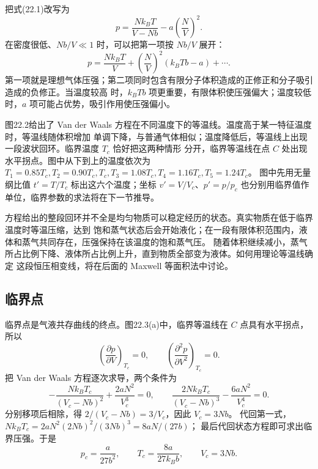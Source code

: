 把式(22.1)改写为
\[
  p=\frac{Nk_BT}{V-Nb}-a\left(\frac NV\right)^2.
\]
在密度很低、$Nb/V\ll1$ 时，可以把第一项按 $Nb/V$ 展开：
\begin{equation}
  \boxed{p=\frac{Nk_BT}{V}
  +\left(\frac NV\right)^2(k_BT b-a)+\cdots }.
  \tag{22.2}
\end{equation}
第一项就是理想气体压强；第二项同时包含有限分子体积造成的正修正和分子吸引造成的负修正。当温度较高
时，$k_BT b$ 项更重要，有限体积使压强偏大；温度较低时，$a$ 项可能占优势，吸引作用使压强偏小。

图22.2给出了 Van der Waals 方程在不同温度下的等温线。温度高于某一特征温度时，等温线随体积增加
单调下降，与普通气体相似；温度降低后，等温线上出现一段波状回环。临界温度 $T_c$ 恰好把这两种情形
分开，临界等温线在点 $C$ 处出现水平拐点。图中从下到上的温度依次为
$T_1=0.85T_c,T_2=0.90T_c,T_c,T_3=1.08T_c,T_4=1.16T_c,T_5=1.24T_c$。
图中先用无量纲比值 $t'=T/T_c$ 标出这六个温度；坐标 $v'=V/V_c$、$p'=p/p_c$
也分别用临界值作单位，临界参数的求法将在下一节推导。

\vdWIsotherms
{}

方程给出的整段回环并不全是均匀物质可以稳定经历的状态。真实物质在低于临界温度时等温压缩，达到
饱和蒸气状态后会开始液化；在一段有限体积范围内，液体和蒸气共同存在，压强保持在该温度的饱和蒸气压。
随着体积继续减小，蒸气所占比例下降、液体所占比例上升，直到物质全部变为液体。如何用理论等温线确定
这段恒压相变线，将在后面的 Maxwell 等面积法中讨论。

\subsection*{临界点}

临界点是气液共存曲线的终点。图22.3(a)中，临界等温线在 $C$ 点具有水平拐点，所以
\[
  \left(\frac{\partial p}{\partial V}\right)_{T_c}=0,
  \qquad
  \left(\frac{\partial^2 p}{\partial V^2}\right)_{T_c}=0.
\]
把 Van der Waals 方程逐次求导，两个条件为
\[ -\frac{Nk_BT_c}{(V_c-Nb)^2}+\frac{2aN^2}{V_c^3}=0,
\qquad \frac{2Nk_BT_c}{(V_c-Nb)^3}-\frac{6aN^2}{V_c^4}=0.\]
分别移项后相除，得 $2/(V_c-Nb)=3/V_c$，因此 $V_c=3Nb$。
代回第一式，$Nk_BT_c=2aN^2(2Nb)^2/(3Nb)^3=8aN/(27b)$；
最后代回状态方程即可求出临界压强。于是
\begin{equation}
  \boxed{p_c=\frac{a}{27b^2},\qquad
  T_c=\frac{8a}{27k_Bb},\qquad V_c=3Nb}.
  \tag{22.3}
\end{equation}

\criticalPointFigure
{}

